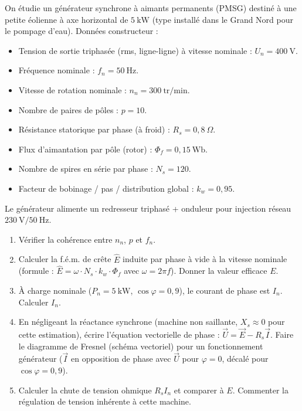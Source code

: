 \documentclass[11pt]{article}
\begin{document}
\begin{exercice}
\label{exo:probatoire_eolienne}
On étudie un générateur synchrone à aimants permanents (PMSG) destiné à une petite éolienne à axe horizontal de $5~\text{kW}$ (type installé dans le Grand Nord pour le pompage d'eau).
Données constructeur :
\begin{itemize}
    \item Tension de sortie triphasée (rms, ligne-ligne) à vitesse nominale : $U_n = 400~\text{V}$.
    \item Fréquence nominale : $f_n = 50~\text{Hz}$.
    \item Vitesse de rotation nominale : $n_n = 300~\text{tr/min}$.
    \item Nombre de paires de pôles : $p = 10$.
    \item Résistance statorique par phase (à froid) : $R_s = 0,8~\Omega$.
    \item Flux d'aimantation par pôle (rotor) : $\Phi_f = 0,15~\text{Wb}$.
    \item Nombre de spires en série par phase : $N_s = 120$.
    \item Facteur de bobinage / pas / distribution global : $k_w = 0,95$.
\end{itemize}
Le générateur alimente un redresseur triphasé + onduleur pour injection réseau $230~\text{V} / 50~\text{Hz}$.
\begin{enumerate}
    \item Vérifier la cohérence entre $n_n$, $p$ et $f_n$.
    \item Calculer la f.é.m. de crête $\hat{E}$ induite par phase à vide à la vitesse nominale (formule : $\hat{E} = \omega \cdot N_s \cdot k_w \cdot \Phi_f$ avec $\omega = 2\pi f$). Donner la valeur efficace $E$.
    \item À charge nominale ($P_n = 5~\text{kW}$, $\cos\varphi = 0,9$), le courant de phase est $I_n$. Calculer $I_n$.
    \item En négligeant la réactance synchrone (machine non saillante, $X_s \approx 0$ pour cette estimation), écrire l'équation vectorielle de phase : $\vec{U} = \vec{E} - R_s \vec{I}$. Faire le diagramme de Fresnel (schéma vectoriel) pour un fonctionnement générateur ($\vec{I}$ en opposition de phase avec $\vec{U}$ pour $\varphi=0$, décalé pour $\cos\varphi=0,9$).
    \item Calculer la chute de tension ohmique $R_s I_n$ et comparer à $E$. Commenter la régulation de tension inhérente à cette machine.

\end{enumerate}
\end{exercice}
\end{document}
